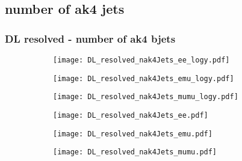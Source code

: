 \documentclass[aspectratio=169,8pt]{beamer}
\begin{document}
\subsection{number of ak4 jets}
\begin{frame}
\frametitle{DL resolved - number of ak4 bjets}
\begin{figure}
\captionsetup[subfigure]{labelformat=empty}
\begin{subfigure}{0.32\textwidth}
\texttt{[image: DL\_resolved\_nak4Jets\_ee\_logy.pdf]}
\vspace*{-0.15cm}
\end{subfigure}
\hfil
\begin{subfigure}{0.32\textwidth}
\texttt{[image: DL\_resolved\_nak4Jets\_emu\_logy.pdf]}
\vspace*{-0.15cm}
\end{subfigure}
\hfil
\begin{subfigure}{0.32\textwidth}
\texttt{[image: DL\_resolved\_nak4Jets\_mumu\_logy.pdf]}
\vspace*{-0.15cm}
\end{subfigure}
\hfil
\begin{subfigure}{0.32\textwidth}
\texttt{[image: DL\_resolved\_nak4Jets\_ee.pdf]}
\vspace*{-0.15cm}
\end{subfigure}
\hfil
\begin{subfigure}{0.32\textwidth}
\texttt{[image: DL\_resolved\_nak4Jets\_emu.pdf]}
\vspace*{-0.15cm}
\end{subfigure}
\hfil
\begin{subfigure}{0.32\textwidth}
\texttt{[image: DL\_resolved\_nak4Jets\_mumu.pdf]}
\vspace*{-0.15cm}
\end{subfigure}
\hfil
\end{figure}
\end{frame}
\newpage
\end{document}
